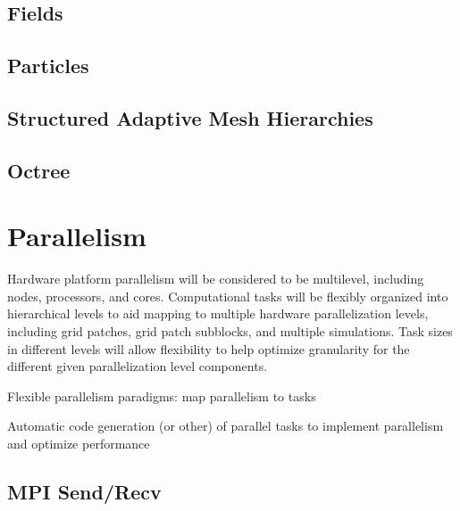 \documentclass{book}
\begin{document}
\subsection{Fields}

\subsection{Particles}

\subsection{Structured Adaptive Mesh Hierarchies}

\subsection{Octree}

\section{Parallelism}

Hardware platform parallelism will be considered to be multilevel,
including nodes, processors, and cores.  Computational tasks will be
flexibly organized into hierarchical levels to aid mapping to multiple
hardware parallelization levels, including grid patches, grid patch
subblocks, and multiple simulations.  Task sizes in different levels
will allow flexibility to help optimize granularity for the different
given parallelization level components.

Flexible parallelism paradigms: map parallelism to tasks

Automatic code generation (or other) of parallel tasks to implement
parallelism and optimize performance

\subsection{MPI Send/Recv}

\end{document}
